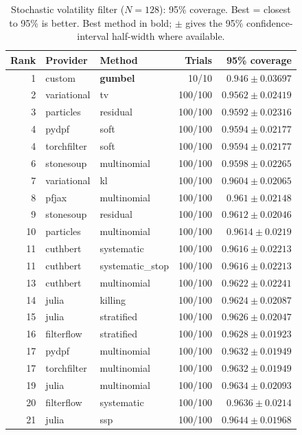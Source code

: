 \begin{table}[!htbp]
\centering
\small
\caption{Stochastic volatility filter ($N=128$): 95\% coverage. Best = closest to 95\% is better. Best method in bold; $\pm$ gives the 95\% confidence-interval half-width where available.}
\label{tab:stochastic-volatility-filter-coverage95}
\begin{tabular}{rllrr}
\toprule
Rank & Provider & Method & Trials & 95\% coverage \\
\midrule
1 & custom & \textbf{gumbel} & 10/10 & $\mathbf{0.946 \pm 0.03697}$ \\
2 & variational & tv & 100/100 & $0.9562 \pm 0.02419$ \\
3 & particles & residual & 100/100 & $0.9592 \pm 0.02316$ \\
4 & pydpf & soft & 100/100 & $0.9594 \pm 0.02177$ \\
4 & torchfilter & soft & 100/100 & $0.9594 \pm 0.02177$ \\
6 & stonesoup & multinomial & 100/100 & $0.9598 \pm 0.02265$ \\
7 & variational & kl & 100/100 & $0.9604 \pm 0.02065$ \\
8 & pfjax & multinomial & 100/100 & $0.961 \pm 0.02148$ \\
9 & stonesoup & residual & 100/100 & $0.9612 \pm 0.02046$ \\
10 & particles & multinomial & 100/100 & $0.9614 \pm 0.0219$ \\
11 & cuthbert & systematic & 100/100 & $0.9616 \pm 0.02213$ \\
11 & cuthbert & systematic\_stop & 100/100 & $0.9616 \pm 0.02213$ \\
13 & cuthbert & multinomial & 100/100 & $0.9622 \pm 0.02241$ \\
14 & julia & killing & 100/100 & $0.9624 \pm 0.02087$ \\
15 & julia & stratified & 100/100 & $0.9626 \pm 0.02047$ \\
16 & filterflow & stratified & 100/100 & $0.9628 \pm 0.01923$ \\
17 & pydpf & multinomial & 100/100 & $0.9632 \pm 0.01949$ \\
17 & torchfilter & multinomial & 100/100 & $0.9632 \pm 0.01949$ \\
19 & julia & multinomial & 100/100 & $0.9634 \pm 0.02093$ \\
20 & filterflow & systematic & 100/100 & $0.9636 \pm 0.0214$ \\
21 & julia & ssp & 100/100 & $0.9644 \pm 0.01968$ \\

\end{tabular}
\end{table}

